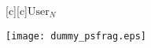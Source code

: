\documentclass{article}
\begin{document}
\begin{figure}[htb]
  \begin{center}


        [c][c]{\hspace{5mm}$\mathrm{User}_N$}


    \texttt{[image: dummy\_psfrag.eps]}
    \end{center}
\end{figure}
\end{document}
